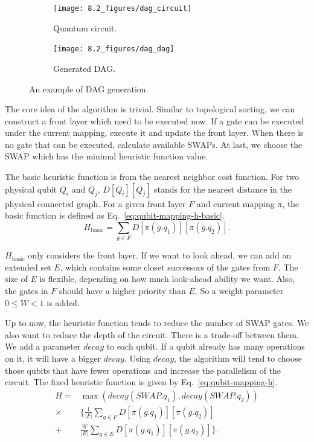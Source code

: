 \begin{figure}
	\centering
	\begin{subfigure}{0.49\textwidth}
		\centering
		\texttt{[image: 8.2\_figures/dag\_circuit]}
		\caption{Quantum circuit.}
	\end{subfigure}
	\begin{subfigure}{0.49\textwidth}
		\centering
		\texttt{[image: 8.2\_figures/dag\_dag]}
		\caption{Generated DAG.}
	\end{subfigure}
	\caption{An example of DAG generation.}
	\label{fig:qubit-mapping-dag}
\end{figure}

The core idea of the algorithm is trivial. Similar to topological sorting, we can construct a front layer which need to be executed now. If a gate can be executed under the current mapping, execute it and update the front layer. When there is no gate that can be executed, calculate available SWAPs. At last, we choose the SWAP which has the minimal heuristic function value.

The basic heuristic function is from the nearest neighbor cost function. For two physical qubit $Q_i$ and $Q_j$, $D[Q_i][Q_j]$ stands for the nearest distance in the physical connected graph. For a given front layer $F$ and current mapping $\pi$, the basic function is defined as
Eq.~\eqref{eq:qubit-mapping-h-basic}.
\begin{equation} \label{eq:qubit-mapping-h-basic}
	H_{\text{basic}} = \sum_{g \in F} D[\pi (g.q_1)][\pi (g.q_2)].
\end{equation}

$H_{\text{basic}}$ only considers the front layer. If we want to look ahead, we can add an extended set $E$, which contains some closet successors of the gates from $F$. The size of $E$ is flexible, depending on how much look-ahead ability we want. Also, the gates in $F$ should have a higher priority than $E$. So a weight parameter $0 \leq W < 1$ is added.

Up to now, the heuristic function tends to reduce the number of SWAP gates. We also want to reduce the depth of the circuit. There is a trade-off between them. We add a parameter $decay$ to each qubit. If a qubit already has many operations on it, it will have a bigger $decay$. Using $decay$, the algorithm will tend to choose those qubits that have fewer operations and increase the parallelism of the circuit. The fixed heuristic function is given by
Eq.~\eqref{eq:qubit-mapping-h}.
\begin{equation} \label{eq:qubit-mapping-h}
	\begin{aligned}
		H =    & \max \left( decay(SWAP.q_1), decay(SWAP.q_2) \right)                \\
		\times & \Big\lbrace \frac{1}{|F|} \sum_{g \in F} D[\pi(g.q_1)][\pi(g.q_2)]  \\
		+      & \frac{W}{|E|} \sum_{g \in E} D[\pi(g.q_1)][\pi(g.q_2)] \Big\rbrace.
	\end{aligned}
\end{equation}

